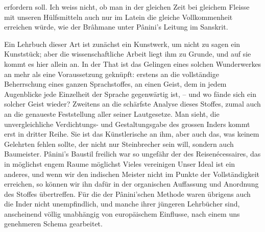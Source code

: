 erfordern soll. Ich weiss nicht, ob man in der gleichen Zeit bei gleichem Fleisse mit unseren Hülfsmitteln auch nur im Latein die gleiche Vollkommenheit erreichen würde, wie der Brâhmane unter Pânini’s Leitung im Sanskrit.

Ein Lehrbuch dieser Art ist zunächst ein Kunstwerk, um nicht zu sagen ein Kunststück; aber die wissenschaftliche Arbeit liegt ihm zu Grunde, und auf sie kommt es hier allein an. In der That ist das Gelingen eines solchen Wunderwerkes an mehr als eine Voraussetzung geknüpft: erstens an die vollständige Beherrschung eines ganzen Sprachstoffes, an einen Geist, dem in jedem Augenblicke jede Einzelheit der Sprache gegenwärtig ist, – und wo fände sich ein solcher Geist wieder? \label{fp.23} Zweitens an die schärfste Analyse dieses Stoffes, zumal auch an die genaueste Feststellung aller seiner Lautgesetze. Man sieht, die unvergleichliche Verdichtungs- und Gestaltungsgabe des grossen Inders kommt erst in dritter Reihe. Sie ist das Künstlerische an ihm, aber auch das, was keinem Gelehrten fehlen sollte, der nicht nur Steinbrecher sein will, sondern auch Baumeister. Pânini’s Baustil freilich war so ungefähr der des Reisenécessaires, das in möglichst engem Raume möglichst Vieles vereinigen  Unser Ideal ist ein anderes, und wenn wir den indischen Meister nicht im Punkte der Vollständigkeit erreichen, so können wir ihn dafür in der organischen Auffassung und Anordnung des Stoffes übertreffen. Für die  der Pânini’schen Methode waren übrigens auch die Inder nicht unempfindlich, und manche ihrer jüngeren Lehrbücher sind, anscheinend völlig unabhängig von europäischem Einflusse, nach einem uns genehmeren Schema gearbeitet.

\label{sp.24}

